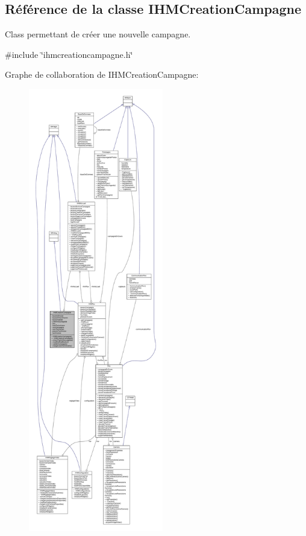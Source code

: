 \hypertarget{class_i_h_m_creation_campagne}{}\subsection{Référence de la classe I\+H\+M\+Creation\+Campagne}
\label{class_i_h_m_creation_campagne}


Class permettant de créer une nouvelle campagne.  




{\ttfamily \#include \char`\"{}ihmcreationcampagne.\+h\char`\"{}}



Graphe de collaboration de I\+H\+M\+Creation\+Campagne\+:
\nopagebreak
\begin{figure}[H]
\begin{center}
\leavevmode
\includegraphics[height=550pt]{class_i_h_m_creation_campagne__coll__graph}
\end{center}
\end{figure}
